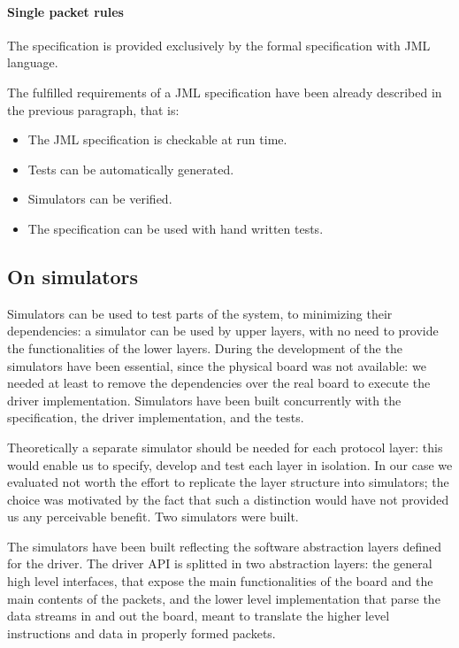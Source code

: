 \documentclass{article} \usepackage{times}
\begin{document}
\paragraph{Single packet rules}

The specification is provided exclusively by the formal specification
with JML language.

The fulfilled requirements of a JML specification have been already
described in the previous paragraph, that is:

\begin{itemize}
\item The JML specification is checkable at run time.
\item Tests can be automatically generated.
\item Simulators can be verified.
\item The specification can be used with hand written tests.
\end{itemize}

\subsection{On simulators}
\label{subsec:on_simulators}

Simulators can be used to test parts of the system, to minimizing
their dependencies: a simulator can be used by upper layers, with no
need to provide the functionalities of the lower layers.  During the
development of the \STSB the simulators have been essential, since the
physical board was not available: we needed at least to remove the
dependencies over the real board to execute the driver implementation.
Simulators have been built concurrently with the specification, the
driver implementation, and the tests.

Theoretically a separate simulator should be needed for each protocol
layer: this would enable us to specify, develop and test each layer in
isolation.  In our case we evaluated not worth the effort to replicate
the layer structure into simulators; the choice was motivated by the
fact that such a distinction would have not provided us any
perceivable benefit.  Two simulators were built.

The simulators have been built reflecting the software abstraction
layers defined for the driver.  The driver API is splitted in two
abstraction layers: the general high level interfaces, that expose the
main functionalities of the board and the main contents of the
packets, and the lower level implementation that parse the data
streams in and out the board, meant to translate the higher level
instructions and data in properly formed packets.
\end{document}
